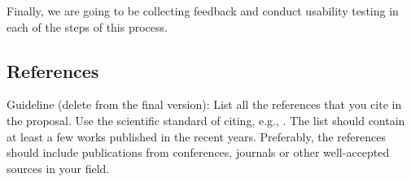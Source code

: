 \documentclass[a4paper, 12pt]{article}
\newcommand\cmnt[1]{\textcolor{munsell}{#1}}
\begin{document}
Finally, we are going to be collecting feedback and conduct usability testing in each of the steps of this process. 


\subsection{References}
\label{literatura}

\cmnt{
Guideline (delete from the final version):
List all the references that you cite in the proposal. Use the scientific standard of citing, e.g.,
\cite{Zivkovic2004}. The list should contain at least a few works published in the recent years. Preferably, the references should include publications from conferences, journals or other well-accepted sources in your field.
}

\renewcommand\refname{}
\vspace{-50px}






%
\end{document}
